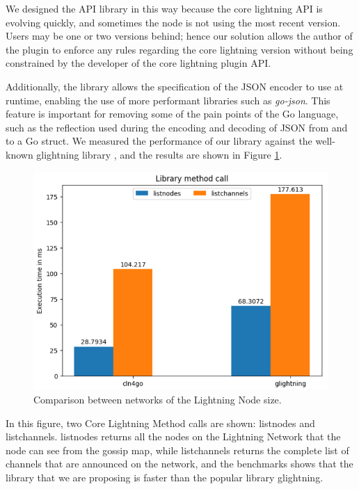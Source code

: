 We designed the API library in this way because the core lightning API is 
evolving quickly, and sometimes the node is not using the most recent version. 
Users may be one or two versions behind; hence our solution allows the author of 
the plugin to enforce any rules regarding the core lightning version without being 
constrained by the developer of the core lightning plugin API.

Additionally, the library allows the specification of the JSON encoder to use 
at runtime, enabling the use of more performant libraries 
such as \emph{go-json}\cite{gojson}. This feature is 
important for removing some of the pain points of the Go language, 
such as the reflection used during the encoding and decoding of JSON from and 
to a Go struct. We measured the performance of our library against the well-known 
glightning library \cite{glightning}, and the results are shown 
in Figure \ref{fig:api-go-bench}.

\begin{figure}[H]
    \begin{center}
      \includegraphics[scale=0.5]{imgs/api-go-bench.png}
    \end{center}
    \caption{Comparison between networks of the Lightning Node size.}
    \label{fig:api-go-bench}
\end{figure}

In this figure, two Core Lightning Method calls are shown: listnodes and listchannels. listnodes
returns all the nodes on the Lightning Network that the node can see from the
gossip map, while listchannels returns the complete list of channels that are announced
on the network, and the benchmarks shows that the library that we are proposing is faster
than the popular library glightning.


